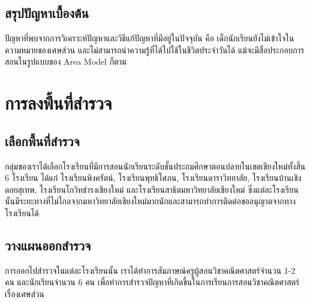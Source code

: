 \subsection{สรุปปัญหาเบื้องต้น}
ปัญหาที่พบจากการวิเคราะห์ปัญหาและวิธีแก้ปัญหาที่มีอยู่ในปัจจุบัน คือ เด็กนักเรียนยังไม่เข้าใจในความหมายของเศษส่วน
 และไม่สามารถนำความรู้ที่ได้ไปใช้ในชีวิตประจำวันได้ แม้จะมีสื่อประกอบการสอนในรูปแบบของ Area Model ก็ตาม

\section{การลงพื้นที่สำรวจ}

\subsection{เลือกพี้นที่สำรวจ}
กลุ่มของเราได้เลือกโรงเรียนที่มีการสอนนักเรียนระดับชั้นประถมศึกษาตอนปลายในเขตเชียงใหม่ทั้งสิ้น 6 โรงเรียน ได้แก่ โรงเรียนพิงครัตน์, โรงเรียนพุทธิโศภน, โรงเรียนดาราวิทยาลัย, โรงเรียนบ้านเชิงดอยสุเทพ, โรงเรียนโกวิทธำรงเชียงใหม่ และโรงเรียนสาธิตมหาวิทยาลัยเชียงใหม่
 ซึ่งแต่ละโรงเรียนนั้นมีระยะทางที่ไม่ไกลจากมหาวิทยาลัยเชียงใหม่มากนักและสามารถทำการติดต่อขออนุญาตจากทางโรงเรียนได้

\subsection{วางแผนออกสำรวจ}
การออกไปสำรวจในแต่ละโรงเรียนนั้น เราได้ทำการสัมภาษณ์ครูผู้สอนวิชาคณิตศาสตร์จำนวน 1-2 คน และนักเรียนจำนวน 6 คน
 เพื่อทำการสำรวจปัญหาที่เกิดขึ้นในการเรียนการสอนวิชาคณิตศาสตร์เรื่องเศษส่วน